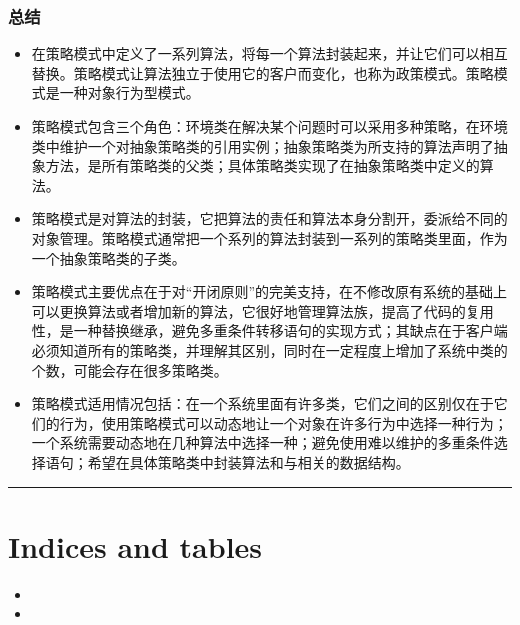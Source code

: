 \documentclass[letterpaper,10pt,english]{sphinxmanual}
\begin{document}
\subsection{总结}
\label{\detokenize{behavioral_patterns/strategy:id15}}\begin{itemize}
\item {} 
\sphinxAtStartPar
在策略模式中定义了一系列算法，将每一个算法封装起来，并让它们可以相互替换。策略模式让算法独立于使用它的客户而变化，也称为政策模式。策略模式是一种对象行为型模式。

\item {} 
\sphinxAtStartPar
策略模式包含三个角色：环境类在解决某个问题时可以采用多种策略，在环境类中维护一个对抽象策略类的引用实例；抽象策略类为所支持的算法声明了抽象方法，是所有策略类的父类；具体策略类实现了在抽象策略类中定义的算法。

\item {} 
\sphinxAtStartPar
策略模式是对算法的封装，它把算法的责任和算法本身分割开，委派给不同的对象管理。策略模式通常把一个系列的算法封装到一系列的策略类里面，作为一个抽象策略类的子类。

\item {} 
\sphinxAtStartPar
策略模式主要优点在于对“开闭原则”的完美支持，在不修改原有系统的基础上可以更换算法或者增加新的算法，它很好地管理算法族，提高了代码的复用性，是一种替换继承，避免多重条件转移语句的实现方式；其缺点在于客户端必须知道所有的策略类，并理解其区别，同时在一定程度上增加了系统中类的个数，可能会存在很多策略类。

\item {} 
\sphinxAtStartPar
策略模式适用情况包括：在一个系统里面有许多类，它们之间的区别仅在于它们的行为，使用策略模式可以动态地让一个对象在许多行为中选择一种行为；一个系统需要动态地在几种算法中选择一种；避免使用难以维护的多重条件选择语句；希望在具体策略类中封装算法和与相关的数据结构。

\end{itemize}


\bigskip\hrule\bigskip



\chapter{Indices and tables}
\label{\detokenize{index:indices-and-tables}}\begin{itemize}
\item {} 
\sphinxAtStartPar
{}

\item {} 
\sphinxAtStartPar
{}

\end{itemize}



\renewcommand{\indexname}{Index}
\printindex
\end{document}
